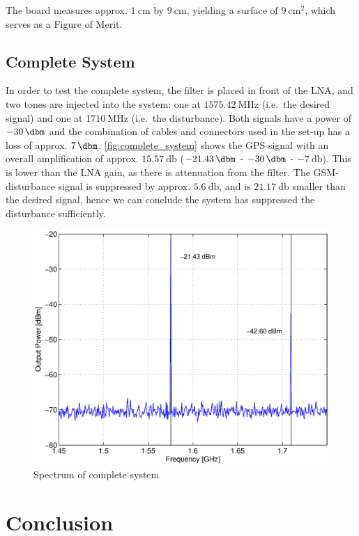 \documentclass[a4paper]{article}        %
\begin{document}
  The board measures approx. $\SI{1}{\centi\meter}$ by $\SI{9}{\centi\meter}$, yielding a surface of $\SI{9}{\centi\meter\squared}$, which serves as a Figure of Merit. 

  \subsection{Complete System}
  In order to test the complete system, the filter is placed in front of the LNA, and two tones are injected into the system: one at $\SI{1575.42}{\mega\hertz}$ (i.e.\ the desired signal) and one at $\SI{1710}{\mega\hertz}$ (i.e.\ the disturbance).  
  Both signals have a power of $\SI{-30}{\dbm}$ and the combination of cables and connectors used in the set-up has a loss of approx. $\SI{7}{\dbm}$.
  \autoref{fig:complete_system} shows the GPS signal with an overall amplification of approx. $\SI{15.57}{\decibel}$ ($\SI{-21.43}{\dbm}$ - $\SI{-30}{\dbm}$ - $\SI{-7}{\decibel}$). This is lower than the LNA gain, as there is attenuation from the filter.
  The GSM-disturbance signal is suppressed by approx. $\SI{5.6}{\decibel}$, and is $\SI{21.17}{\decibel}$ smaller than the desired signal, hence we can conclude the system has suppressed the disturbance sufficiently.
  \begin{figure}[H]
    \centering
    \includegraphics[width=\textwidth]{fig/Filter/spectrum_system.eps}
    \caption{Spectrum of complete system}
    \label{fig:complete_system}
  \end{figure}
\section{Conclusion}
\end{document}
